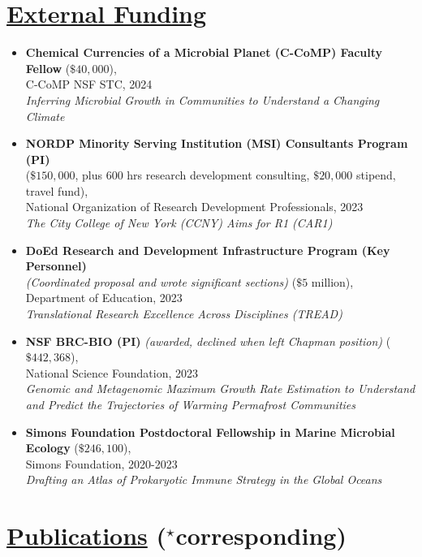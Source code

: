 \documentclass[]{res}
\begin{document}
\begin{resume}
\section{\underline{External Funding}} %
\begin{itemize} 
\item[] {\bf Chemical Currencies of a Microbial Planet (C-CoMP) Faculty Fellow} ($\$40,000$),\\ C-CoMP NSF STC, 2024\\\emph{Inferring Microbial Growth in Communities to Understand a Changing Climate}\\
\item[] {\bf NORDP Minority Serving Institution (MSI) Consultants Program (PI)}\\ ($\$150,000$, plus 600 hrs research development consulting, $\$20,000$ stipend, travel fund),\\ National Organization of Research Development Professionals, 2023\\\emph{The City College of New York (CCNY) Aims for R1 (CAR1)}\\
\item[] {\bf DoEd Research and Development Infrastructure Program (Key Personnel)}\\ \emph{(Coordinated proposal and wrote significant sections)} ($\$5$ million),\\ Department of Education, 2023\\\emph{Translational Research Excellence Across Disciplines (TREAD)}\\
\item[] {\bf NSF BRC-BIO (PI)} \emph{(awarded, declined when left Chapman position)} ($\$442,368$),\\ National Science Foundation, 2023\\\emph{Genomic and Metagenomic Maximum Growth Rate Estimation to Understand and Predict the Trajectories of Warming Permafrost Communities}\\
\item[] {\bf Simons Foundation Postdoctoral Fellowship in Marine Microbial Ecology} ($\$246,100$),\\ Simons Foundation, 2020-2023\\\emph{Drafting an Atlas of Prokaryotic Immune Strategy in the Global Oceans}
\end{itemize} 

\newpage
 
 \section{\underline{Publications} ($^\star$corresponding)} \vspace{-1mm}
 

\end{resume}
\end{document}
